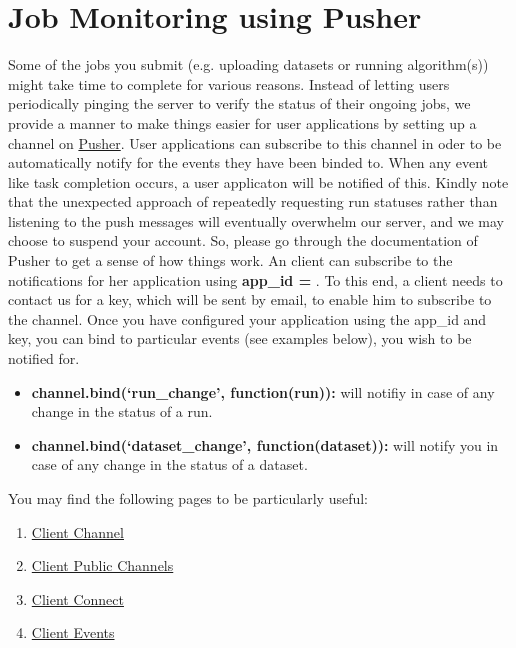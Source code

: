 \documentclass[a4paper,10pt]{scrartcl}
\begin{document}
\section{Job Monitoring using Pusher}
Some of the jobs you submit (e.g. uploading datasets or running algorithm(s)) might take time to complete
for various reasons. Instead of letting users periodically pinging the server to verify the status of their
ongoing jobs, we provide a manner to make things easier for user applications by setting up a channel on \href{https://pusher.com/}{Pusher}.
User applications can subscribe to this channel in oder to be automatically notify for the events they have been binded to.
When any event like task completion occurs, a user applicaton will be notified of this. Kindly note that the unexpected
approach of repeatedly requesting run statuses rather than listening to the push messages will eventually overwhelm our 
server, and we may choose to suspend your account. So, please go through the documentation of Pusher to get a sense of how
things work. An client can subscribe to the notifications for her application using \textbf{app\_id = }.
To this end, a client needs to contact us for a key, which will be sent by email, to enable him to subscribe to the channel. Once you 
have configured your application using the app\_id and key, you can bind to particular events (see examples below), you wish to be notified for.

\begin{itemize}
 \item \textbf{channel.bind(`run\_change', function(run){}):} will notifiy in case of any change in the status of a run.
 \item \textbf{channel.bind(`dataset\_change', function(dataset){}):} will notify you in case of any change in the status of a dataset. 
\end{itemize}
You may find the following pages to be particularly useful:
\begin{enumerate}
 \item \href{https://pusher.com/docs/client_api_guide/client_channels}{Client Channel}
 \item \href{https://pusher.com/docs/client_api_guide/client_public_channels}{Client Public Channels}
 \item \href{https://pusher.com/docs/client_api_guide/client_connect}{Client Connect}
 \item \href{https://pusher.com/docs/client_api_guide/client_events}{Client Events}
\end{enumerate}
\end{document}
